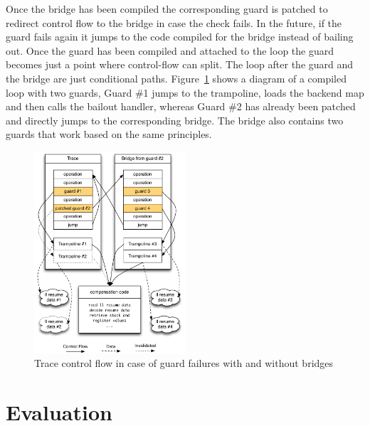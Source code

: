\documentclass[10pt,preprint]{sigplanconf}
\begin{document}
Once the bridge has been compiled the corresponding guard is
patched to redirect control flow to the bridge in case the check fails. In
the future, if the guard fails again it jumps to the code compiled for the bridge
instead of bailing out. Once the guard has been compiled and attached to the
loop the guard becomes just a point where control-flow can split. The loop
after the guard and the bridge are just conditional paths.
Figure~\ref{fig:trampoline} shows a diagram of a compiled loop with two guards,
Guard \#1 jumps to the trampoline, loads the backend map and
then calls the bailout handler, whereas Guard \#2 has already been patched
and directly jumps to the corresponding bridge. The bridge also contains two
guards that work based on the same principles.
\begin{figure}
\centering
\includegraphics[width=0.5\textwidth]{figures/loop_bridge.pdf}
\caption{Trace control flow in case of guard failures with and without bridges}
\label{fig:trampoline}
\end{figure}



\section{Evaluation}
\label{sec:evaluation}
\end{document}

